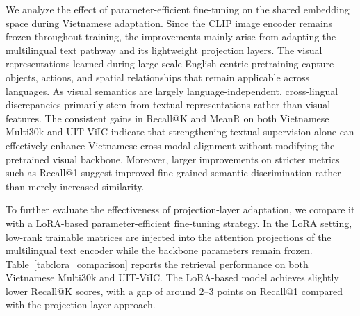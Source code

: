 We analyze the effect of parameter-efficient fine-tuning on the shared embedding space during Vietnamese adaptation. Since the CLIP image encoder remains frozen throughout training, the improvements mainly arise from adapting the multilingual text pathway and its lightweight projection layers. The visual representations learned during large-scale English-centric pretraining capture objects, actions, and spatial relationships that remain applicable across languages. As visual semantics are largely language-independent, cross-lingual discrepancies primarily stem from textual representations rather than visual features. The consistent gains in Recall@K and MeanR on both Vietnamese Multi30k and UIT-ViIC indicate that strengthening textual supervision alone can effectively enhance Vietnamese cross-modal alignment without modifying the pretrained visual backbone. Moreover, larger improvements on stricter metrics such as Recall@1 suggest improved fine-grained semantic discrimination rather than merely increased similarity.


To further evaluate the effectiveness of projection-layer adaptation, we compare it with a LoRA-based parameter-efficient fine-tuning strategy. In the LoRA setting, low-rank trainable matrices are injected into the attention projections of the multilingual text encoder while the backbone parameters remain frozen. Table~\ref{tab:lora_comparison} reports the retrieval performance on both Vietnamese Multi30k and UIT-ViIC. The LoRA-based model achieves slightly lower Recall@K scores, with a gap of around 2--3 points on Recall@1 compared with the projection-layer approach.

\begin{table}[ht]
\centering
\caption{Comparison between projection-layer tuning and LoRA for cross-modal retrieval on Vietnamese Multi30k and UIT-ViIC.}
\label{tab:lora_comparison}
\scriptsize
\setlength{\tabcolsep}{3pt}
\renewcommand{\arraystretch}{1.1}
\end{table}


